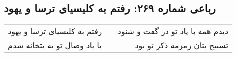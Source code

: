 \begin{center}
\section*{رباعی شماره ۲۶۹: رفتم به کلیسیای ترسا و یهود}
\label{sec:sh269}
\begin{longtable}{l p{0.5cm} r}
رفتم به کلیسیای ترسا و یهود
&&
دیدم همه با یاد تو در گفت و شنود
\\
با یاد وصال تو به بتخانه شدم
&&
تسبیح بتان زمزمه ذکر تو بود
\\
\end{longtable}
\end{center}
